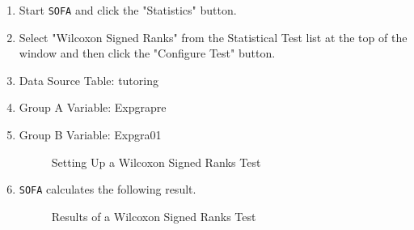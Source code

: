 \begin{enumerate}
  \item Start \texttt{SOFA} and click the "Statistics" button.
  \item Select "Wilcoxon Signed Ranks" from the Statistical Test list at the top of the window and then click the "Configure Test" button.
  \item Data Source Table: tutoring
  \item Group A Variable: Expgrapre
  \item Group B Variable: Expgra01
  
  \begin{figure}[H]
    \begin{center}
      \caption{Setting Up a Wilcoxon Signed Ranks Test}
    \end{center}
  \end{figure}
  
  \item \texttt{SOFA} calculates the following result.
  
  \begin{figure}[H]
    \begin{center}
      \caption{Results of a Wilcoxon Signed Ranks Test}
    \end{center}
  \end{figure}
  

\end{enumerate}
